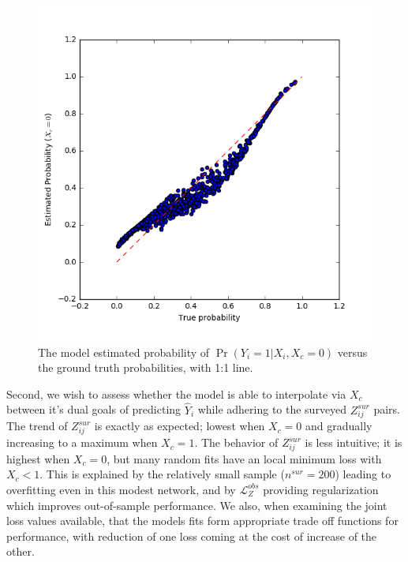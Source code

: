         \begin{figure}
            \centering
            \includegraphics{fig_softmono/synthetic_p_fit.png}
            \caption{The model estimated probability of $\Pr(Y_i = 1 | X_i, X_c = 0)$ versus the ground truth probabilities, with 1:1 line.}
            \label{fig:sm_synthetic_p_fit}
        \end{figure}
        
        Second, we wish to assess whether the model is able to interpolate via $X_c$ between it's dual goals of predicting $\hat{Y}_i$ while adhering to the surveyed $Z_{ij}^{sur}$ pairs.  The trend of $Z_{ij}^{sur}$ is exactly as expected; lowest when $X_c = 0$ and gradually increasing to a maximum when $X_c = 1$.  The behavior of $Z_{ij}^{sur}$ is less intuitive; it is highest when $X_c = 0$, but many random fits have an local minimum loss with $X_c < 1$.  This is explained by the relatively small sample ($n^{sur} = 200$) leading to overfitting even in this modest network, and by $\mathcal{L}_Z^{obs}$ providing regularization which improves out-of-sample performance.  We also, when examining the joint loss values available, that the models fits form appropriate trade off functions for performance, with reduction of one loss coming at the cost of increase of the other. 
        
